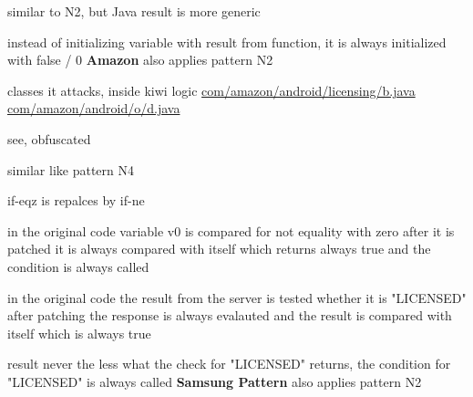 similar to N2, but Java result is more generic



instead of initializing variable with result from function, it is always initialized with false / 0
\newline
\newline
\textbf{Amazon}\newline
also applies pattern N2

classes it attacks, inside kiwi logic
\url{com/amazon/android/licensing/b.java}
\url{com/amazon/android/o/d.java}

see, obfuscated

similar like pattern N4



if-eqz is repalces by if-ne


in the original code variable v0 is compared for not equality with zero
after it is patched it is always compared with itself which returns always true and the condition is always called



in the original code the result from the server is tested whether it is "LICENSED"
after patching the response is always evalauted and the result is compared with itself which is always true

result
never the less what the check for "LICENSED" returns, the condition for "LICENSED" is always called
\newline
\newline
\textbf{Samsung Pattern}\newline
also applies pattern N2

